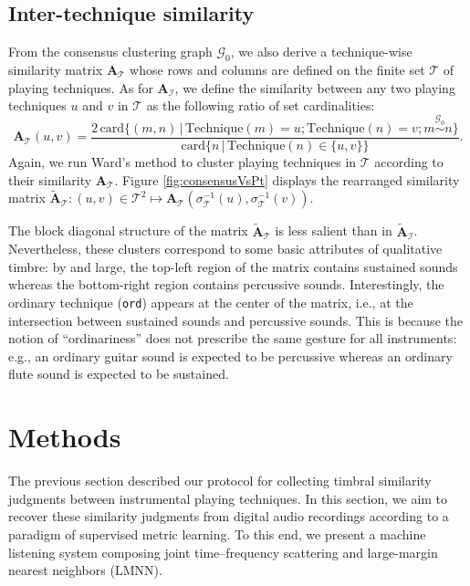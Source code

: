 \documentclass{bmcart}
\makeatletter
\newcommand*{\eg}{e.g.,\@\xspace}
\newcommand*{\ie}{i.e.,\@\xspace}
\newcommand{\Card}{\mathrm{card}}
\newcommand{\nmu}{}
\makeatother
\begin{document}
\subsection*{Inter-technique similarity}
From the consensus clustering graph $\mathcal{G}_0$, we also derive a technique-wise similarity matrix $\mathbf{A}_{\mathcal{T}}$ whose rows and columns are defined on the finite set $\mathcal{T}$ of playing techniques.
As for $\mathbf{A}_{\mathcal{I}}$, we define the similarity between any two playing techniques $u$ and $v$ in $\mathcal{T}$ as the following ratio of set cardinalities:
\begin{equation}
\mathbf{A}_{\mathcal{T}}(u,v) = \dfrac{
2\,\Card \big\{ (m, n) \,\vert\, \mathrm{Technique}(m)=u ; \mathrm{Technique}(n)=v ; m \overset{\mathcal{G}_0}{\sim} n \big\}
}{
\Card \big\{n \,\vert\, \mathrm{Technique}(n) \in \{ u, v \} \big\}
}.
\label{eq:technique-similarity}
\end{equation}
Again, we run Ward's method to cluster playing techniques in $\mathcal{T}$ according to their similarity $\mathbf{A}_{\mathcal{T}}$.
Figure \ref{fig:consensusVsPt} displays the rearranged similarity matrix $\widetilde{\mathbf{A}}_{\mathcal{T}} : (u,v)\in \mathcal{T}^2 \mapsto \mathbf{A}_{\mathcal{T}}(\sigma_{\mathcal{T}}^{-1}(u), \sigma_{\mathcal{T}}^{-1}(v))$.

The block diagonal structure of the matrix $\widetilde{\mathbf{A}}_{\mathcal{T}}$ is less salient than in $\widetilde{\mathbf{A}}_{\mathcal{I}}$.
Nevertheless, these clusters correspond to some basic attributes of qualitative timbre: by and large, the top-left region of the matrix contains sustained sounds whereas the bottom-right region contains percussive sounds.
Interestingly, the ordinary technique (\texttt{ord}) appears at the center of the matrix, \ie{} at the intersection between sustained sounds and percussive sounds.
This is because the notion of ``ordinariness'' does not prescribe the same gesture for all instruments: \eg{} an ordinary guitar sound is expected to be percussive whereas an ordinary flute sound is expected to be sustained.

\section*{\nmu Methods}
\label{sec:methods}
The previous section described our protocol for collecting timbral similarity judgments between instrumental playing techniques.
In this section, we aim to recover these similarity judgments from digital audio recordings according to a paradigm of supervised metric learning.
To this end, we present a machine listening system composing joint time--frequency scattering and large-margin nearest neighbors (LMNN).
\end{document}
